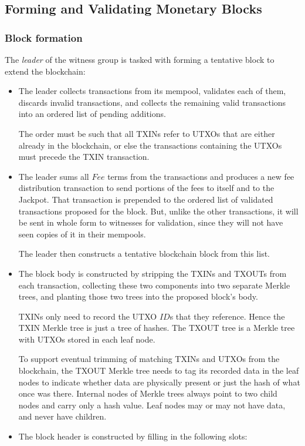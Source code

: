 \documentclass[a4paper, 10pt, conference]{ieeeconf}
\begin{document}
\subsection{Forming and Validating Monetary Blocks}\label{block}

\subsubsection{Block formation} The \textit{leader} of the witness group is tasked with forming a tentative block to extend the blockchain:

\begin{itemize}
	\item {The leader collects transactions from its mempool, validates each of them, discards invalid transactions, and collects the remaining valid transactions into an ordered list of pending additions.

	The order must be such that all TXINs refer to UTXOs that are either already in the blockchain, or else the transactions containing the UTXOs must precede the TXIN transaction.}
	\item {The leader sums all $Fee$ terms from the transactions and produces a new fee distribution transaction to send portions of the fees to itself and to the Jackpot. That transaction is prepended to the ordered list of validated transactions proposed for the block. But, unlike the other transactions, it will be sent in whole form to witnesses for validation, since they will not have seen copies of it in their mempools.

	The leader then constructs a tentative blockchain block from this list.}
	\item {The block body is constructed by stripping the TXINs and TXOUTs from each transaction, collecting these two components into two separate Merkle trees, and planting those two trees into the proposed block's body.

	TXINs only need to record the UTXO $ID$s that they reference. Hence the TXIN Merkle tree is just a tree of hashes. The TXOUT tree is a Merkle tree with UTXOs stored in each leaf node.

	To support eventual trimming of matching TXINs and UTXOs from the blockchain, the TXOUT Merkle tree needs to tag its recorded data in the leaf nodes to indicate whether data are physically present or just the hash of what once was there. Internal nodes of Merkle trees always point to two child nodes and carry only a hash value. Leaf nodes may or may not have data, and never have children.}
	\item {The block header is constructed by filling in the following slots:

}
\end{itemize}
\end{document}
